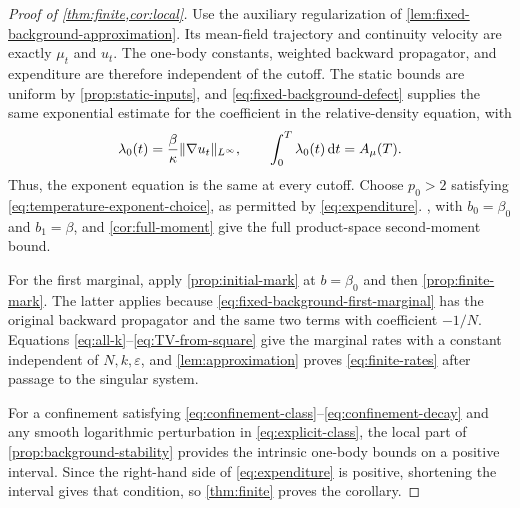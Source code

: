 \documentclass[11pt,reqno]{amsart}
\numberwithin{equation}{section}
\theoremstyle{plain}
\theoremstyle{remark}
\DeclarePairedDelimiter{\norm}{\lVert}{\rVert}
\begin{document}
\begin{proof}[Proof of \cref{thm:finite,cor:local}]
Use the auxiliary regularization of \cref{lem:fixed-background-approximation}. Its mean-field trajectory and continuity velocity are exactly $\mu_t$ and $u_t$. The one-body constants, weighted backward propagator, and expenditure are therefore independent of the cutoff. The static bounds are uniform by \cref{prop:static-inputs}, and \eqref{eq:fixed-background-defect} supplies the same exponential estimate for the coefficient in the relative-density equation, with
\begin{equation}\label{eq:fixed-background-expenditure}
 \lambda_0(t)=\frac\beta\kappa\norm{\nabla u_t}_{L^\infty},
 \qquad \int_0^T\lambda_0(t)\dd t=A_\mu(T).
\end{equation}
Thus, the exponent equation is the same at every cutoff. Choose $p_0>2$ satisfying \eqref{eq:temperature-exponent-choice}, as permitted by \eqref{eq:expenditure}. , with $b_0=\beta_0$ and $b_1=\beta$, and \cref{cor:full-moment} give the full product-space second-moment bound.

For the first marginal, apply \cref{prop:initial-mark} at $b=\beta_0$ and then \cref{prop:finite-mark}. The latter applies because \eqref{eq:fixed-background-first-marginal} has the original backward propagator and the same two terms with coefficient $-1/N$. Equations \eqref{eq:all-k}--\eqref{eq:TV-from-square} give the marginal rates with a constant independent of $N,k,\varepsilon$, and \cref{lem:approximation} proves \eqref{eq:finite-rates} after passage to the singular system.

For a confinement satisfying \eqref{eq:confinement-class}--\eqref{eq:confinement-decay} and any smooth logarithmic perturbation in \eqref{eq:explicit-class}, the local part of \cref{prop:background-stability} provides the intrinsic one-body bounds on a positive interval. Since the right-hand side of \eqref{eq:expenditure} is positive, shortening the interval gives that condition, so \cref{thm:finite} proves the corollary.
\end{proof}
\end{document}
